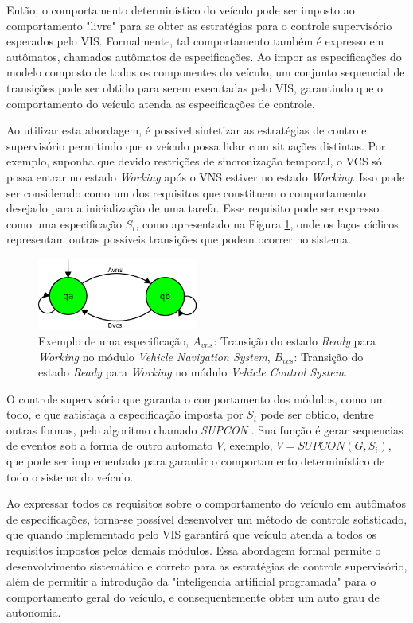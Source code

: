 \documentclass[conference]{IEEEtran}
\begin{document}
Então, o comportamento determinístico do veículo pode ser imposto ao comportamento "livre" para se obter as estratégias para o controle supervisório esperados pelo VIS. Formalmente, tal comportamento também é expresso em autômatos, chamados autômatos de especificações. 
Ao impor as especificações do modelo composto de todos os componentes do veículo, um conjunto sequencial de transições pode ser obtido para serem executadas pelo VIS, garantindo que o comportamento do veículo atenda as especificações de controle. 

Ao utilizar esta abordagem, é possível sintetizar as estratégias de controle supervisório permitindo que o veículo possa lidar com situações distintas. Por exemplo, suponha que devido restrições de sincronização temporal, o VCS só possa entrar no estado \textit{Working} após o VNS estiver no estado \textit{Working}. Isso pode ser considerado como um dos requisitos que constituem o comportamento desejado para a inicialização de uma tarefa. Esse requisito pode ser expresso como uma especificação $S_{i}$, como apresentado na Figura \ref{fig:VILMA_TRANSITION_EXAMPLE}, onde os laços cíclicos representam outras possíveis transições que podem ocorrer no sistema.

\begin{figure}[h]
	\centering
	\includegraphics[width=200px,keepaspectratio]{imagens/VILMA_TRANSITION_EXAMPLE}
	\caption{Exemplo de uma especificação, $A_{vns}$: Transição do estado \textit{Ready} para \textit{Working} no módulo \textit{Vehicle Navigation System}, $B_{vcs}$: Transição do estado \textit{Ready} para \textit{Working} no módulo \textit{Vehicle Control System}.}
	\label{fig:VILMA_TRANSITION_EXAMPLE}
\end{figure}

O controle supervisório que garanta o comportamento dos módulos, como um todo, e que satisfaça a especificação imposta por $S_{i}$ pode ser obtido, dentre outras formas, pelo algoritmo chamado \textit{SUPCON} \cite{supcom_wonham1987supremal}. Sua função é gerar sequencias de eventos sob a forma de outro automato $V$, exemplo, $ V = SUPCON(G,S_{i})$, que pode ser implementado para garantir o comportamento determinístico de todo o sistema do veículo.

Ao expressar todos os requisitos sobre o comportamento do veículo em autômatos de especificações, torna-se possível desenvolver um método de controle sofisticado, que quando implementado pelo VIS garantirá que veículo atenda a todos os requisitos impostos pelos demais módulos. Essa abordagem formal permite o desenvolvimento sistemático e correto para as estratégias de controle supervisório, além de permitir a introdução da "inteligencia artificial programada" para o comportamento geral do veículo, e consequentemente obter um auto grau de autonomia.
\end{document}
